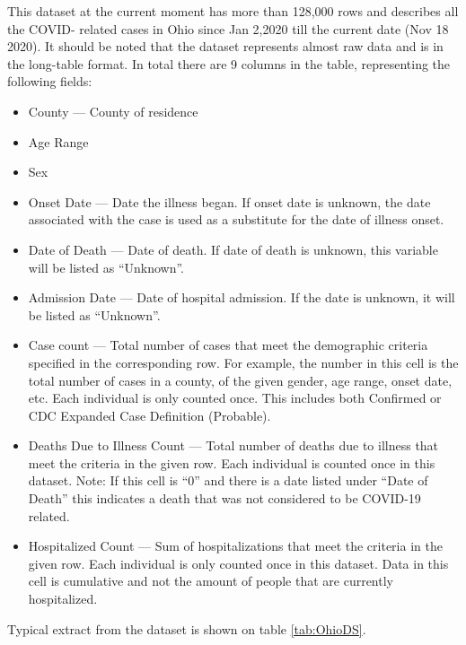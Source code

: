 \documentclass[conference]{IEEEtran}
\begin{document}
	This dataset at the current moment has more
        than 128,000 rows and describes all the COVID- related cases in Ohio since Jan 2,2020 till the current date (Nov 18 2020). It should be noted that the dataset represents almost raw data and is in the long-table format. In total there are 9 columns in the table, representing the following fields:
        \begin{itemize}
        \item County --- County of residence
        \item Age Range
         \item Sex
        \item Onset Date --- Date the illness began. If onset date is unknown, the date associated with the case is used as a substitute for the date of illness onset.
        \item Date of Death --- Date of death. If date of death is unknown, this variable will be listed as “Unknown”.
        \item Admission Date --- Date of hospital admission. If the date is unknown, it will be listed as “Unknown”.
        \item Case count --- Total number of cases that meet the demographic criteria specified in the corresponding row. For example, the number in this cell is the total number of cases in a county, of the given gender, age range, onset date, etc. Each individual is only counted once. This includes both Confirmed or CDC Expanded Case Definition (Probable).
        \item Deaths Due to Illness Count --- Total number of deaths due to illness that meet the criteria in the given row. Each individual is counted once in this dataset. Note: If this cell is “0” and there is a date listed under “Date of Death” this indicates a death that was not considered to be COVID-19 related.
        \item Hospitalized Count --- Sum of hospitalizations that meet the criteria in the given row. Each individual is only counted once in this dataset. Data in this cell is cumulative and not the amount of people that are currently hospitalized.
        \end{itemize}
Typical extract from the dataset is shown on table \ref{tab:OhioDS}.
\end{document}

